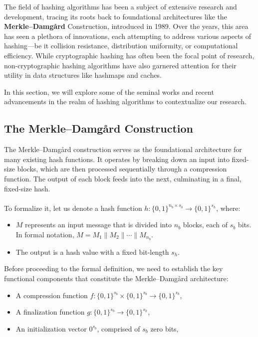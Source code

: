 \documentclass[10pt]{article}
\begin{document}
The field of hashing algorithms has been a subject of extensive research and development, tracing its roots back to foundational architectures like the \textbf{Merkle–Damgård} Construction\cite{merkle}\cite{damgard}, introduced in 1989. Over the years, this area has seen a plethora of innovations, each attempting to address various aspects of hashing—be it collision resistance, distribution uniformity, or computational efficiency. While cryptographic hashing has often been the focal point of research, non-cryptographic hashing algorithms have also garnered attention for their utility in data structures like hashmaps and caches.

In this section, we will explore some of the seminal works and recent advancements in the realm of hashing algorithms to contextualize our research.

\subsection{The Merkle--Damgård Construction}

The Merkle–Damgård construction serves as the foundational architecture for many existing hash functions.
It operates by breaking down an input into fixed-size blocks, which are then processed sequentially through a compression
function. The output of each block feeds into the next, culminating in a final, fixed-size hash.\\\\
To formalize it, let us denote a hash function \( h: \{0,1\}^{n_b \times s_b} \to \{0,1\}^{s_h} \), where:
\begin{itemize}
    \item \( M \) represents an input message that is divided into \( n_b \) blocks, each of \( s_b \) bits. In formal notation, \( M = M_1 \parallel M_2 \parallel \cdots \parallel M_{n_b} \).
    \item The output is a hash value with a fixed bit-length \( s_h \).
\end{itemize}
Before proceeding to the formal definition, we need to establish the key functional components that constitute the Merkle--Damgård architecture:
\begin{itemize}
    \item A compression function \( f: \{0,1\}^{s_b} \times \{0,1\}^{s_b} \to \{0,1\}^{s_b} \),
    \item A finalization function \( g: \{0,1\}^{s_b} \to \{0,1\}^{s_h} \),
    \item An initialization vector \( 0^{s_b} \), comprised of \( s_b \) zero bits,
\end{itemize}
\end{document}
